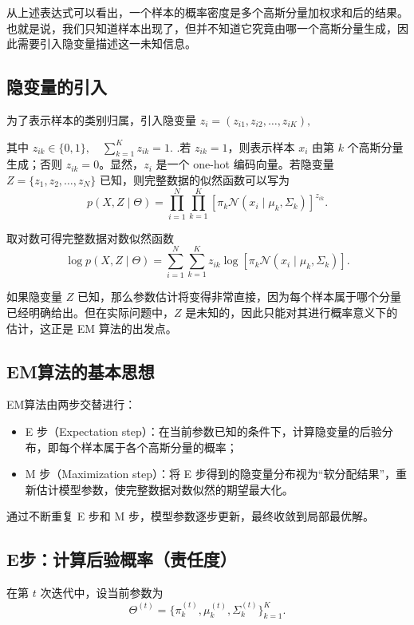 \documentclass[12pt,a4paper]{ctexart}
\begin{document}
从上述表达式可以看出，一个样本的概率密度是多个高斯分量加权求和后的结果。也就是说，我们只知道样本出现了，但并不知道它究竟由哪一个高斯分量生成，因此需要引入隐变量描述这一未知信息。

\subsection*{隐变量的引入}

为了表示样本的类别归属，引入隐变量 $z_i=(z_{i1},z_{i2},\dots,z_{iK}),$ 

其中
$z_{ik}\in\{0,1\},\quad \sum_{k=1}^{K}z_{ik}=1.$ .若 $z_{ik}=1$，则表示样本 $x_i$ 由第 $k$ 个高斯分量生成；否则 $z_{ik}=0$。显然，$z_i$ 是一个 one-hot 编码向量。若隐变量 $Z=\{z_1,z_2,\dots,z_N\}$ 已知，则完整数据的似然函数可以写为
\[
p(X,Z\mid \Theta)=\prod_{i=1}^{N}\prod_{k=1}^{K}
\left[\pi_k \mathcal{N}(x_i\mid \mu_k,\Sigma_k)\right]^{z_{ik}}.
\]

取对数可得完整数据对数似然函数
\[
\log p(X,Z\mid \Theta)=
\sum_{i=1}^{N}\sum_{k=1}^{K}
z_{ik}\log\left[\pi_k \mathcal{N}(x_i\mid \mu_k,\Sigma_k)\right].
\]

如果隐变量 $Z$ 已知，那么参数估计将变得非常直接，因为每个样本属于哪个分量已经明确给出。但在实际问题中，$Z$ 是未知的，因此只能对其进行概率意义下的估计，这正是 EM 算法的出发点。

\subsection*{EM算法的基本思想}

EM算法由两步交替进行：

\begin{itemize}
	\item E 步（Expectation step）：在当前参数已知的条件下，计算隐变量的后验分布，即每个样本属于各个高斯分量的概率；
	\item M 步（Maximization step）：将 E 步得到的隐变量分布视为“软分配结果”，重新估计模型参数，使完整数据对数似然的期望最大化。
\end{itemize}

通过不断重复 E 步和 M 步，模型参数逐步更新，最终收敛到局部最优解。

\subsection*{E步：计算后验概率（责任度）}

在第 $t$ 次迭代中，设当前参数为
\[
\Theta^{(t)}=\{\pi_k^{(t)},\mu_k^{(t)},\Sigma_k^{(t)}\}_{k=1}^{K}.
\]
\end{document}
